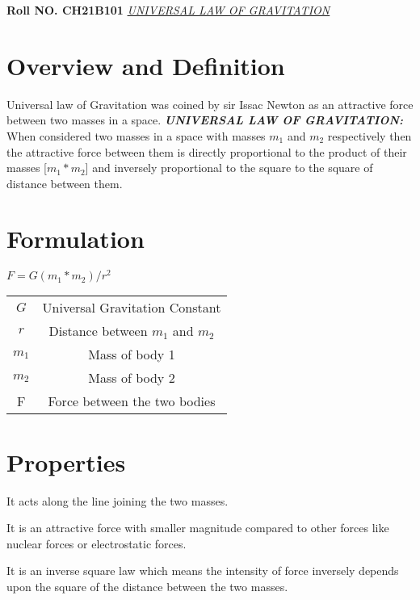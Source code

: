 \documentclass{report}
\begin{document}
\Large{\textbf{Roll NO. CH21B101}}
\newline
\newline
\huge{\textit{\underline{UNIVERSAL LAW OF GRAVITATION}}}
 
\section{Overview and Definition}
\Large{
\Large Universal law of Gravitation was coined by sir Issac Newton as an attractive force between two masses in a space.
\newline
\newline
\textbf{\textit{UNIVERSAL LAW OF GRAVITATION:}} \Large When considered two masses in a space with masses $m_1$ and $m_2$ respectively then the attractive force between them is directly proportional to the product of their masses [$m_1*m_2$] and inversely proportional to the square to the square of distance between them.
}
\section{Formulation}
 
\large{$F= G(m_1*m_2)/r^2$}
\huge{ 
\begin{center}
\begin{tabular}{ |c|c| } 
 \hline
 $G$ & Universal Gravitation Constant \\
 $r$ & Distance between $m_1$ and $m_2$ \\
 $m_1$ & Mass of body 1 \\
 $m_2$ & Mass of body 2 \\
 F & Force between the two bodies \\
 \hline
\end{tabular}
\end{center}
}
\section{Properties}
\begin{itemize}
\Large{
 \item It acts along the line joining the two masses.
 \item It is an attractive force with smaller magnitude compared to other forces like nuclear forces or electrostatic forces.
 \item It is an inverse square law which means the intensity of force inversely depends upon the square of the distance between the two masses.
} 
\end{itemize} 
\end{document}
